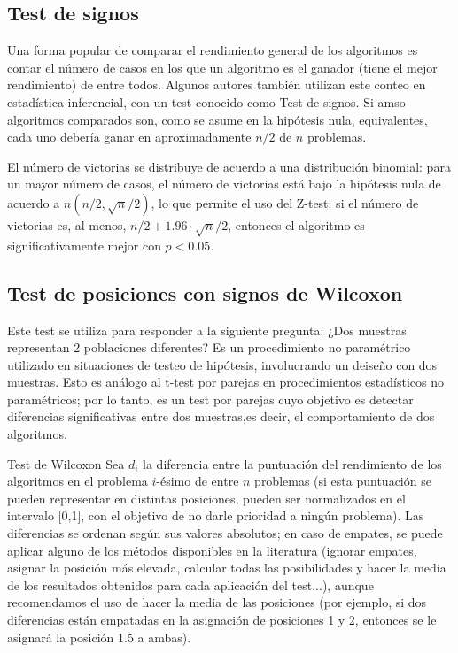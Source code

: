 \subsection{Test de signos}

Una forma popular de comparar el rendimiento general de los algoritmos es contar el número de casos en los que un algoritmo es el ganador (tiene el mejor rendimiento) de entre todos. 
Algunos autores también utilizan este conteo en estadística inferencial, con un test conocido como Test de signos. 
Si amso algoritmos comparados son, como se asume en la hipótesis nula, equivalentes, cada uno debería ganar en aproximadamente $n/2$ de $n$ problemas. 

El número de victorias se distribuye de acuerdo a una distribución binomial: para un mayor número de casos, el número de victorias está bajo la hipótesis nula de acuerdo a $n(n/2, \sqrt{n}/2)$, lo que permite el uso del Z-test: si el número de victorias es, al menos, $n/2 + 1.96\cdot \sqrt{n}/2$, entonces el algoritmo es significativamente mejor con $p < 0.05$. 

\subsection{Test de posiciones con signos de Wilcoxon}

Este test se utiliza para responder a la siguiente pregunta: ¿Dos muestras representan 2 poblaciones diferentes? 
Es un procedimiento no paramétrico utilizado en situaciones de testeo de hipótesis, involucrando un deiseño con dos muestras. 
Esto es análogo al t-test por parejas en procedimientos estadísticos no paramétricos; por lo tanto, es un test por parejas cuyo objetivo es detectar diferencias significativas entre dos  muestras,es decir, el comportamiento de dos algoritmos. 

\begin{definicion}{Test de Wilcoxon}
Sea $d_i$ la diferencia entre la puntuación del rendimiento de los algoritmos en el problema $i$-ésimo de entre $n$ problemas (si esta puntuación se pueden representar en distintas posiciones, pueden ser normalizados en el intervalo [0,1], con el objetivo de no darle prioridad a ningún problema). 
Las diferencias se ordenan según sus valores absolutos; en caso de empates, se puede aplicar alguno de los métodos disponibles en la literatura (ignorar empates, asignar la posición más elevada, calcular todas las posibilidades y hacer la media de los resultados obtenidos para cada aplicación del test...), aunque recomendamos el uso de hacer la media de las posiciones (por ejemplo, si dos diferencias están empatadas en la asignación de posiciones 1 y 2, entonces se le asignará la posición 1.5 a ambas).
\end{definicion} 

